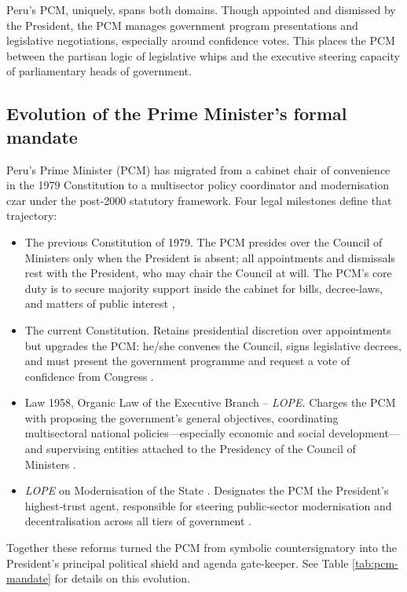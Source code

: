 \documentclass[a4paper, 12pt]{article}
\begin{document}
Peru's PCM, uniquely, spans both domains. Though appointed and dismissed by the President, the PCM manages government program presentations and legislative negotiations, especially around confidence votes. This places the PCM between the partisan logic of legislative whips and the executive steering capacity of parliamentary heads of government.


\subsection{Evolution of the Prime Minister’s formal mandate} Peru’s Prime Minister (PCM) has migrated from a cabinet chair of convenience in the 1979 Constitution to a multisector policy coordinator and modernisation czar under the post‑2000 statutory framework.  Four legal milestones define that trajectory:


\begin{itemize}
\item The previous Constitution of 1979. The PCM presides over the Council of Ministers only when the President is absent; all appointments and dismissals rest with the President, who may chair the Council at will.  The PCM’s core duty is to secure majority support inside the cabinet for bills, decree‑laws, and matters of public interest \citep[arts.215-218]{peru_constitucion_1979},

\item The current Constitution. Retains presidential discretion over appointments but upgrades the PCM: he/she convenes the Council, signs legislative decrees, and must present the government programme and request a vote of confidence from Congress \citep[arts.122-127]{peru_constitucion_1993}.
\item Law 1958, Organic Law of the Executive Branch – \emph{LOPE}. Charges the PCM with proposing the government’s general objectives, coordinating multisectoral national policies—especially economic and social development—and supervising entities attached to the Presidency of the Council of Ministers \citep[ch. II]{peru_ley_2007}. 
\item \emph{LOPE} on Modernisation of the State \citep[art.19]{peru_ley_2007}. Designates the PCM the President’s highest‑trust agent, responsible for steering public‑sector modernisation and decentralisation across all tiers of government . 
\end{itemize}

Together these reforms turned the PCM from symbolic countersignatory into the President’s principal political shield and agenda gate‑keeper. See Table \ref{tab:pcm-mandate} for details on this evolution.
\end{document}
